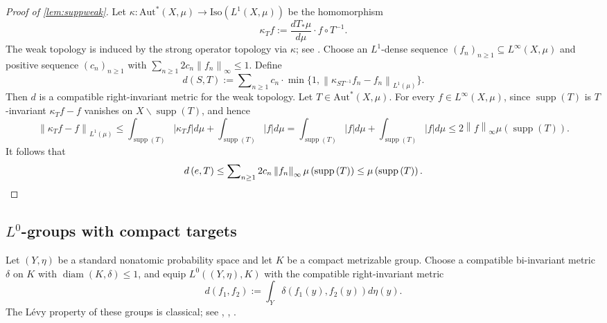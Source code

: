 \documentclass{amsart}
\numberwithin{equation}{subsection}
\theoremstyle{plain}
\theoremstyle{definition}
\theoremstyle{plain}
\begin{document}
\begin{proof}[Proof of \cref{lem:suppweak}]
Let \(\kappa:\mathrm{Aut}^{\ast}\left(X,\mu\right)\to\mathrm{Iso}\left(L^{1}\left(X,\mu\right)\right)\) be the homomorphism
\[\kappa_{T}f:=\frac{dT_{\ast}\mu}{d\mu}\cdot f\circ T^{-1}.\]
The weak topology is induced by the strong operator topology via \(\kappa\); see \cite[\S4.1]{giordano2007some}. Choose an \(L^{1}\)-dense sequence \(\left(f_{n}\right)_{n\geq1}\subseteq L^{\infty}\left(X,\mu\right)\) and positive sequence \(\left(c_{n}\right)_{n\geq 1}\) with \(\sum\nolimits_{n\geq1}2c_{n}\left\|f_{n}\right\|_{\infty}\leq1\). Define
\[d\left(S,T\right):=\sum\nolimits_{n\geq1}c_{n}\cdot\min\big\{1,\left\|\kappa_{ST^{-1}}f_{n}-f_{n}\right\|_{L^{1}\left(\mu\right)}\big\}.\]
Then \(d\) is a compatible right-invariant metric for the weak topology. Let \(T\in\mathrm{Aut}^{\ast}\left(X,\mu\right)\). For every \(f\in L^{\infty}\left(X,\mu\right)\), since \(\operatorname{supp}\left(T\right)\) is \(T\)-invariant \(\kappa_{T}f-f\) vanishes on \(X\backslash\operatorname{supp}\left(T\right)\), and hence
\[\left\|\kappa_{T}f-f\right\|_{L^{1}\left(\mu\right)}\leq\int_{\operatorname{supp}\left(T\right)}\left|\kappa_{T}f\right|d\mu+\int_{\operatorname{supp}\left(T\right)}\left|f\right|d\mu=\int_{\operatorname{supp}\left(T\right)}\left|f\right|d\mu+\int_{\operatorname{supp}\left(T\right)}\left|f\right|d\mu\leq2\left\|f\right\|_{\infty}\mu\left(\operatorname{supp}\left(T\right)\right).\]
It follows that
\[d\left(e,T\right)\leq\sum\nolimits_{n\geq1}2c_{n}\left\Vert f_{n}\right\Vert_{\infty}\mu\left(\operatorname{supp}\left(T\right)\right)\leq\mu\left(\text{supp}\left(T\right)\right).\qedhere\]
\end{proof}

\subsection{\(L^{0}\)-groups with compact targets}

Let \(\left(Y,\eta\right)\) be a standard nonatomic probability space and let \(K\) be a compact metrizable group. Choose a compatible bi-invariant metric \(\delta\) on \(K\) with \(\operatorname{diam}\left(K,\delta\right)\leq1\), and equip \(L^{0}\left(\left(Y,\eta\right),K\right)\) with the compatible right-invariant metric
\[d\left(f_{1},f_{2}\right):=\int_{Y}\delta\left(f_{1}\left(y\right),f_{2}\left(y\right)\right)d\eta\left(y\right).\]
The L\'{e}vy property of these groups is classical; see \cite[\S A.5]{glasner2005automorphism}, \cite[\S4.2]{Pestov2006}, \cite[Corrs.~2.10--2.11]{giordano2007some}.
\end{document}
